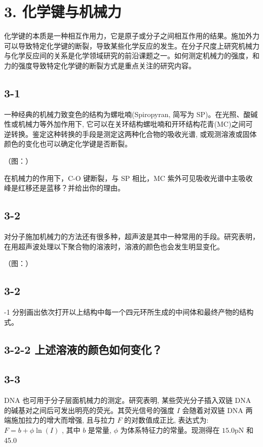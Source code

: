 \section*{3. 化学键与机械力}
化学键的本质是一种相互作用力，它是原子或分子之间相互作用的结果。施加外力可以导致特定化学键的断裂，导致某些化学反应的发生。在分子尺度上研究机械力与化学反应间的关系是化学领域研究的前沿课题之一。如何测定机械力的强度，和力的强度导致特定化学键的断裂方式是重点关注的研究内容。

\subsection*{3-1}
一种经典的机械力致变色的结构为螺吡喃(Spiropyran, 简写为 SP)。在光照、酸碱性或机械力等外加作用下, 它可以在关环结构螺吡喃和开环结构花青(MC)之间可逆转换。鉴定这种转换的手段是测定这两种化合物的吸收光谱, 或观测溶液或固体颜色的变化也可以确定化学键是否断裂。

（图：）

在机械力的作用下，C-O 键断裂，与 SP 相比，MC 紫外可见吸收光谱中主吸收峰是红移还是蓝移？并给出你的理由。

\subsection*{3-2}
对分子施加机械力的方法还有很多种，超声波是其中一种常用的手段。研究表明，在用超声波处理以下聚合物的溶液时，溶液的颜色也会发生明显变化。

（图：）

\subsection*{3-2}
-1 分别画出依次打开以上结构中每一个四元环所生成的中间体和最终产物的结构式。

\subsection*{3-2-2 上述溶液的颜色如何变化？}

\subsection*{3-3}
DNA 也可用于分子层面机械力的测定。研究表明, 某些荧光分子插入双链 DNA 的碱基对之间后可发出明亮的荧光。其荧光信号的强度 $I$ 会随着对双链 DNA 两端施加拉力的增大而增强, 且与拉力 $F$ 的对数值成正比, 表达式为: $F = b + \phi \ln (I)$ , 其中 $b$ 是常量, $\phi$ 为体系特征力的常量。现测得在 $15.0 \mathrm{pN}$ 和 45.0

